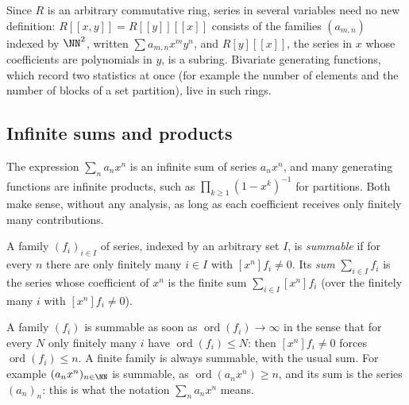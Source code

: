 \begin{remark}\label{generating-functions:remark-several-variables}
Since $R$ is an arbitrary commutative ring, series in several variables need no new definition: $R[[x, y]] = R[[y]][[x]]$ consists of the families $(a_{m,n})$ indexed by $\NN^2$, written
$\sum a_{m,n}x^my^n$, and $R[y][[x]]$, the series in $x$ whose coefficients are polynomials in $y$, is a subring. Bivariate generating functions, which record two statistics at once (for example the
number of elements and the number of blocks of a set partition), live in such rings.
\end{remark}

\subsection{Infinite sums and products}\label{generating-functions:subsection-infinite-sums}

The expression $\sum_na_nx^n$ is an infinite sum of series $a_nx^n$, and many generating functions are infinite products, such as $\prod_{k \geq 1}(1 - x^k)^{-1}$ for partitions. Both make sense,
without any analysis, as long as each coefficient receives only finitely many contributions.

\begin{definition}\label{generating-functions:definition-summable}
A family $(f_i)_{i \in I}$ of series, indexed by an arbitrary set $I$, is \emph{summable} if for every $n$ there are only finitely many $i \in I$ with $[x^n]f_i \neq 0$. Its \emph{sum}
$\sum_{i \in I}f_i$ is the series whose coefficient of $x^n$ is the finite sum $\sum_{i \in I}[x^n]f_i$ (over the finitely many $i$ with $[x^n]f_i \neq 0$).
\end{definition}

A family $(f_i)$ is summable as soon as $\operatorname{ord}(f_i) \to \infty$ in the sense that for every $N$ only finitely many $i$ have $\operatorname{ord}(f_i) \leq N$: then $[x^n]f_i \neq 0$
forces $\operatorname{ord}(f_i) \leq n$. A finite family is always summable, with the usual sum. For example $(a_nx^n)_{n \in \NN}$ is summable, as $\operatorname{ord}(a_nx^n) \geq n$, and its sum
is the series $(a_n)_n$: this is what the notation $\sum_na_nx^n$ means.

